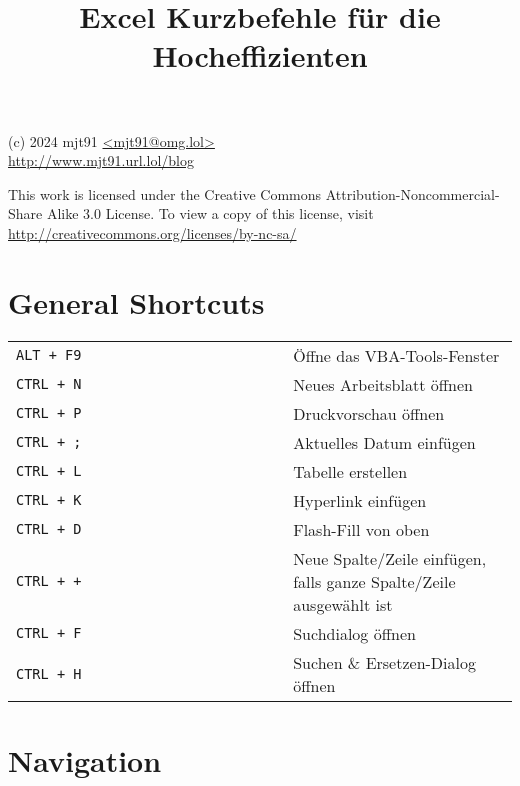 \documentclass[8pt]{extarticle} %
\begin{document}
\raggedright

\begin{multicols}{2}

\title{Excel Kurzbefehle für die Hocheffizienten}

{\small
(c) 2024 mjt91 \url{<mjt91@omg.lol>}\\
\url{http://www.mjt91.url.lol/blog}

This work is licensed under the Creative Commons Attribution-Noncommercial-Share
Alike 3.0 License. To view a copy of this license, visit
\url{http://creativecommons.org/licenses/by-nc-sa/}
}

\vspace*{1pt}

\section{General Shortcuts}

  \vspace{1ex}
  \begin{tabular}{L{0.55\linewidth} L{0.45\linewidth}}

    \tt ALT + F9                & \"Offne das VBA-Tools-Fenster \\
    \tt CTRL + N                & Neues Arbeitsblatt öffnen \\
    \tt CTRL + P                & Druckvorschau öffnen \\
    \tt CTRL + ;                & Aktuelles Datum einfügen \\
    \tt CTRL + L                & Tabelle erstellen \\
    \tt CTRL + K                & Hyperlink einfügen \\
    \tt CTRL + D                & Flash-Fill von oben \\
    \tt CTRL + +                & Neue Spalte/Zeile einfügen, falls ganze Spalte/Zeile ausgewählt ist \\
    \tt CTRL + F                & Suchdialog öffnen \\
    \tt CTRL + H                & Suchen \& Ersetzen-Dialog öffnen \\

  \end{tabular}
  
\section{Navigation}


\end{multicols}
\end{document}
